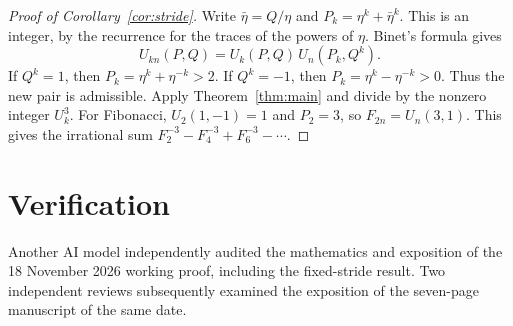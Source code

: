 \documentclass[11pt,letterpaper]{article}
\numberwithin{equation}{section}
\begin{document}
\begin{proof}[Proof of Corollary~\ref{cor:stride}]
Write \(\bar\eta=Q/\eta\) and \(P_k=\eta^k+\bar\eta^k\). This is an
integer, by the recurrence for the traces of the powers of \(\eta\).
Binet's formula gives
\[
                    U_{kn}(P,Q)=U_k(P,Q)\,U_n(P_k,Q^k).
\]
If \(Q^k=1\), then \(P_k=\eta^k+\eta^{-k}>2\). If \(Q^k=-1\),
then \(P_k=\eta^k-\eta^{-k}>0\). Thus the new pair is admissible.
Apply Theorem~\ref{thm:main} and divide by the nonzero integer \(U_k^3\).
For Fibonacci, \(U_2(1,-1)=1\) and \(P_2=3\), so \(F_{2n}=U_n(3,1)\).
This gives the irrational sum \(F_2^{-3}-F_4^{-3}+F_6^{-3}-\cdots\).
\end{proof}

\section*{Verification}
Another AI model independently audited the mathematics and exposition of
the 18 November 2026 working proof, including the fixed-stride result.
Two independent reviews subsequently examined the exposition of the
seven-page manuscript of the same date.
\end{document}
